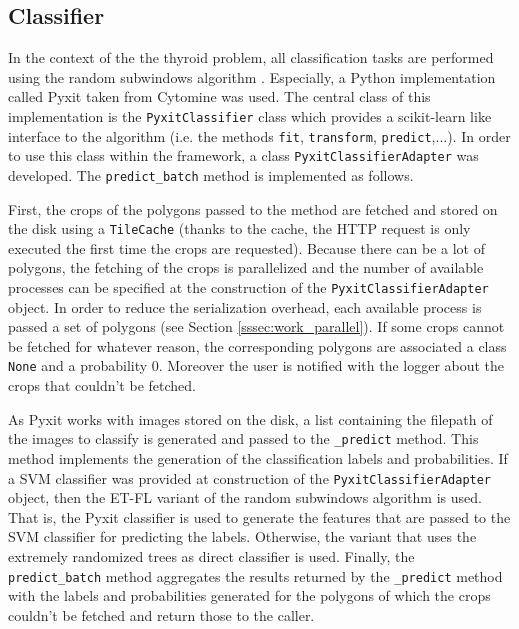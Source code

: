 \subsection{Classifier}

In the context of the the thyroid problem, all classification tasks are performed using the random subwindows algorithm \cite{Maree201617}. Especially, a Python implementation called Pyxit taken from Cytomine \cite{maree2016collaborative} was used. The central class of this implementation is the \texttt{PyxitClassifier} class which provides a scikit-learn like interface to the algorithm (i.e. the methods \texttt{fit}, \texttt{transform}, \texttt{predict},...). In order to use this class within the framework, a class \texttt{PyxitClassifierAdapter} was developed. The \texttt{predict\_batch} method is implemented as follows.

 First, the crops of the polygons passed to the method are fetched and stored on the disk using a \texttt{TileCache} (thanks to the cache, the HTTP request is only executed the first time the crops are requested). Because there can be a lot of polygons, the fetching of the crops is parallelized and the number of available processes can be specified at the construction of the \texttt{PyxitClassifierAdapter} object. In order to reduce the serialization overhead, each available process is passed a set of polygons (see Section \ref{sssec:work_parallel}). If some crops cannot be fetched for whatever reason, the corresponding polygons are associated a class \texttt{None} and a probability 0. Moreover the user is notified with the logger about the crops that couldn't be fetched.

As Pyxit works with images stored on the disk, a list containing the filepath of the images to classify is generated and passed to the \texttt{\_predict} method. This method implements the generation of the classification labels and probabilities. If a SVM classifier was provided at construction of the \texttt{PyxitClassifierAdapter} object, then the ET-FL variant of the random subwindows algorithm is used. That is, the Pyxit classifier is used to generate the features that are passed to the SVM classifier for predicting the labels. Otherwise, the variant that uses the extremely randomized trees as direct classifier is used. Finally, the \texttt{predict\_batch} method aggregates the results returned by the \texttt{\_predict} method with the labels and probabilities generated for the polygons of which the crops couldn't be fetched and return those to the caller.


